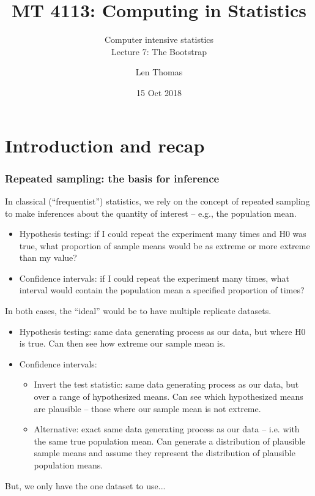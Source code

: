 \documentclass[a4paper,12pt]{article}
\title[MT4113]{MT 4113: Computing in Statistics}
\subtitle{Computer intensive statistics\\Lecture 7: The Bootstrap}
\author[Lecture 7]{Len Thomas}
\date[15/10/2018] {15 Oct 2018}
\newcommand{\bi}{\begin{itemize}}
\newcommand{\ei}{\end{itemize}}
\begin{document}
\begin{frame}
  \titlepage
\end{frame}


\section{Introduction and recap}


\begin{frame}[fragile]
\frametitle{Repeated sampling: the basis for inference}
In classical (``frequentist'') statistics, we rely on the concept of repeated sampling to make inferences about the quantity of interest -- e.g., the population mean.
\bi
\item <2-> Hypothesis testing: if I could repeat the experiment many times and H0 was true, what proportion of sample means would be as extreme or more extreme than my value?
\item <3-> Confidence intervals: if I could repeat the experiment many times, what interval would contain the population mean a specified proportion of times?
\ei
\end{frame}

\begin{frame}[fragile]
In both cases, the ``ideal'' would be to have multiple replicate datasets.
\bi
\item <2->Hypothesis testing: same data generating process as our data, but where H0 is true.  Can then see how extreme our sample mean is.
\item <3->Confidence intervals: 
   \bi 
	 \item <4->Invert the test statistic: same data generating process as our data, but over a range of hypothesized means.  Can see which hypothesized means are plausible -- those where our sample mean is not extreme.
	 \item <5->Alternative: exact same data generating process as our data -- i.e. with the same true population mean.  Can generate a distribution of plausible sample means and assume they represent the distribution of plausible population means.
	 \ei
\ei
But, we only have the one dataset to use...
\end{frame}
\end{document}
